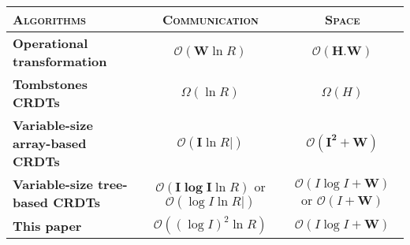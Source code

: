 

\begin{tabular}{@{}lcc@{}}
  \toprule
  \textsc{Algorithms} & \textsc{Communication} & \textsc{Space} \\ \midrule 
  \textbf{Operational transformation~\cite{suleiman1997serialization, sun2009contextbased}} & $\mathcal{O}(\pmb{W}\ln R)$ & $\mathcal{O}(\pmb{H.W})$ \\ \midrule
  \textbf{Tombstones CRDTs~\cite{ahmed2011evaluating, conway2014language, oster2006data, roh2011replicated, weiss2007wooki, wu2010partial, yu2012stringwise}} & $\Omega (\ln R)$ & $\Omega (H)$ \\ \midrule
  \textbf{Variable-size array-based CRDTs~\cite{weiss2009logoot}} & $\mathcal{O}(\pmb{I}\ln R|)$ & $\mathcal{O}(\pmb{I^2+W})$ \\ \midrule
  \textbf{Variable-size tree-based CRDTs~\cite{preguica2009commutative}} & $\mathcal{O}(\pmb{I\log I} \ln R)$ or $\mathcal{O}(\log I\ln R|)$ & $\mathcal{O}(I\log I + \pmb{W})$ or $\mathcal{O}(I + \pmb{W})$ \\ \midrule
  \textbf{This paper~\cite{nedelec2013lseq}} & $\mathcal{O}((\log I)^2\ln R)$ & $\mathcal{O}(I\log I + \pmb{W})$ \\ \bottomrule
\end{tabular}

